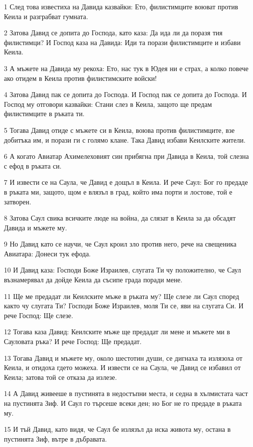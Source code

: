 \par 1 След това известиха на Давида казвайки: Ето, филистимците воюват против Кеила и разграбват гумната.
\par 2 Затова Давид се допита до Господа, като каза: Да ида ли да поразя тия филистимци? И Господ каза на Давида: Иди та порази филистимците и избави Кеила.
\par 3 А мъжете на Давида му рекоха: Ето, нас тук в Юдея ни е страх, а колко повече ако отидем в Кеила против филистимските войски!
\par 4 Затова Давид пак се допита до Господа. И Господ пак се допита до Господа. И Господ му отговори казвайки: Стани слез в Кеила, защото ще предам филистимците в ръката ти.
\par 5 Тогава Давид отиде с мъжете си в Кеила, воюва против филистимците, взе добитъка им, и порази ги с голямо клане. Така Давид избави Кеилските жители.
\par 6 А когато Авиатар Ахимелеховият син прибягна при Давида в Кеила, той слезна с ефод в ръката си.
\par 7 И извести се на Саула, че Давид е дощъл в Кеила. И рече Саул: Бог го предаде в ръката ми, защото, щом е влязъл в град, който има порти и лостове, той е затворен.
\par 8 Затова Саул свика всичките люде на война, да слязат в Кеила за да обсадят Давида и мъжете му.
\par 9 Но Давид като се научи, че Саул кроил зло против него, рече на свещеника Авиатара: Донеси тук ефода.
\par 10 И Давид каза: Господи Боже Израилев, слугата Ти чу положително, че Саул възнамерявал да дойде Кеила да съсипе града поради мене.
\par 11 Ще ме предадат ли Кеилските мъже в ръката му? Ще слезе ли Саул според както чу слугата Ти? Господи Боже Израилев, моля Ти се, яви на слугата Си. И рече Господ: Ще слезе.
\par 12 Тогава каза Давид: Кеилските мъже ще предадат ли мене и мъжете ми в Сауловата ръка? И рече Господ: Ще предадат.
\par 13 Тогава Давид и мъжете му, около шестотин души, се дигнаха та излязоха от Кеила, и отидоха гдето можеха. И извести се на Саула, че Давид се избавил от Кеила; затова той се отказа да излезе.
\par 14 А Давид живееше в пустинята в недостъпни места, и седна в хълмистата част на пустинята Зиф. И Саул го търсеше всеки ден; но Бог не го предаде в ръката му.
\par 15 И тъй Давид, като видя, че Саул бе излязъл да иска живота му, остана в пустинята Зиф, вътре в дъбравата.
